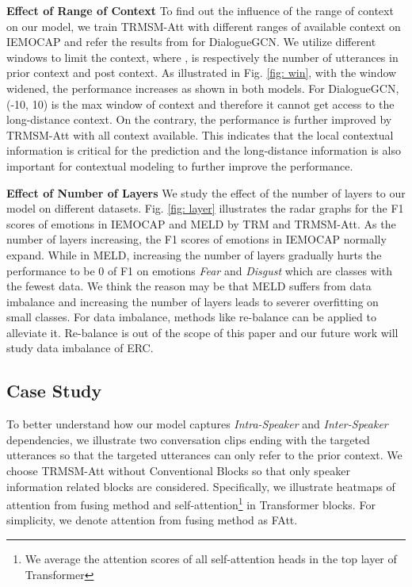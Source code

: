 \documentclass[letterpaper]{article} \usepackage{aaai21}  \usepackage{times}  \usepackage{helvet} \usepackage{courier}  \usepackage[hyphens]{url}  \usepackage{graphicx} \urlstyle{rm} \def\UrlFont{\rm}  \usepackage{natbib}  \usepackage{caption} \usepackage{multirow}
\begin{document}
\textbf{Effect of Range of Context} \quad To find out the influence of the range of context on our model, we train TRMSM-Att with different ranges of available context on IEMOCAP and refer the results from \citet{DialogueGCN} for DialogueGCN. We utilize different windows  to limit the context, where ,  is respectively the number of utterances in prior context and post context. As illustrated in Fig. \ref{fig: win}, with the window widened, the performance increases as shown in both models. For DialogueGCN, (-10, 10) is the max window of context and therefore it cannot get access to the long-distance context. On the contrary, the performance is further improved by TRMSM-Att with all context available. This indicates that the local contextual information is critical for the prediction and the long-distance information is also important for contextual modeling to further improve the performance. 

\textbf{Effect of Number of Layers} \quad We study the effect of the number of layers to our model on different datasets. Fig. \ref{fig: layer} illustrates the radar graphs for the F1 scores of emotions in IEMOCAP and MELD by TRM and TRMSM-Att. As the number of layers increasing, the F1 scores of emotions in IEMOCAP normally expand. While in MELD, increasing the number of layers gradually hurts the performance to be 0 of F1 on emotions \textit{Fear} and \textit{Disgust} which are classes with the fewest data. We think the reason may be that MELD suffers from data imbalance and increasing the number of layers leads to severer overfitting on small classes. For data imbalance, methods like re-balance can be applied to alleviate it. Re-balance is out of the scope of this paper and our future work will study data imbalance of ERC. 

\subsection{Case Study}

To better understand how our model captures \emph{Intra-Speaker} and \emph{Inter-Speaker} dependencies, we illustrate two conversation clips ending with the targeted utterances so that the targeted utterances can only refer to the prior context. We choose TRMSM-Att without Conventional Blocks so that only speaker information related blocks are considered. Specifically, we illustrate heatmaps of attention from fusing method and self-attention\footnote{We average the attention scores of all self-attention heads in the top layer of Transformer} in Transformer blocks. For simplicity, we denote attention from fusing method as FAtt. 
\end{document}
